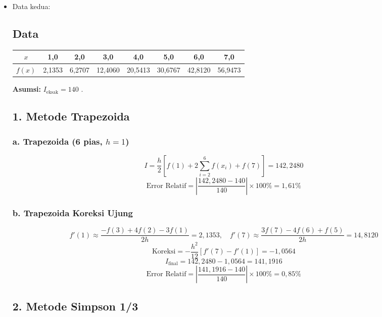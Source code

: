 \documentclass{article}
\begin{document}
\begin{enumerate}
\begin{itemize}
\begin{itemize}
        \end{itemize}

        \item Data kedua: \\
        \subsection*{Data}
        \begin{center}
        \begin{tabular}{|c|ccccccc|}
        \hline
        $x$    & 1,0     & 2,0     & 3,0     & 4,0     & 5,0     & 6,0     & 7,0     \\ \hline
        $f(x)$ & 2,1353  & 6,2707  & 12,4060 & 20,5413 & 30,6767 & 42,8120 & 56,9473 \\ \hline
        \end{tabular}
        \end{center}

        \textbf{Asumsi:} \( I_{\text{eksak}} = 140 \) .

        \subsection*{1. Metode Trapezoida}
        \subsubsection*{a. Trapezoida (6 pias, $h=1$)}
        \[
        I = \frac{h}{2} \left[ f(1) + 2\sum_{i=2}^{6} f(x_i) + f(7) \right] = \boxed{142,2480}
        \]
        \[
        \text{Error Relatif} = \left| \frac{142,2480 - 140}{140} \right| \times 100\% = \boxed{1,61\%}
        \]

        \subsubsection*{b. Trapezoida Koreksi Ujung}
        \[
        f'(1) \approx \frac{-f(3) + 4f(2) - 3f(1)}{2h} = 2,1353, \quad f'(7) \approx \frac{3f(7) - 4f(6) + f(5)}{2h} = 14,8120
        \]
        \[
        \text{Koreksi} = -\frac{h^2}{12} \left[ f'(7) - f'(1) \right] = -1,0564
        \]
        \[
        I_{\text{final}} = 142,2480 - 1,0564 = \boxed{141,1916}
        \]
        \[
        \text{Error Relatif} = \left| \frac{141,1916 - 140}{140} \right| \times 100\% = \boxed{0,85\%}
        \]

        \subsection*{2. Metode Simpson 1/3}

\end{itemize}
\end{enumerate}
\end{document}
